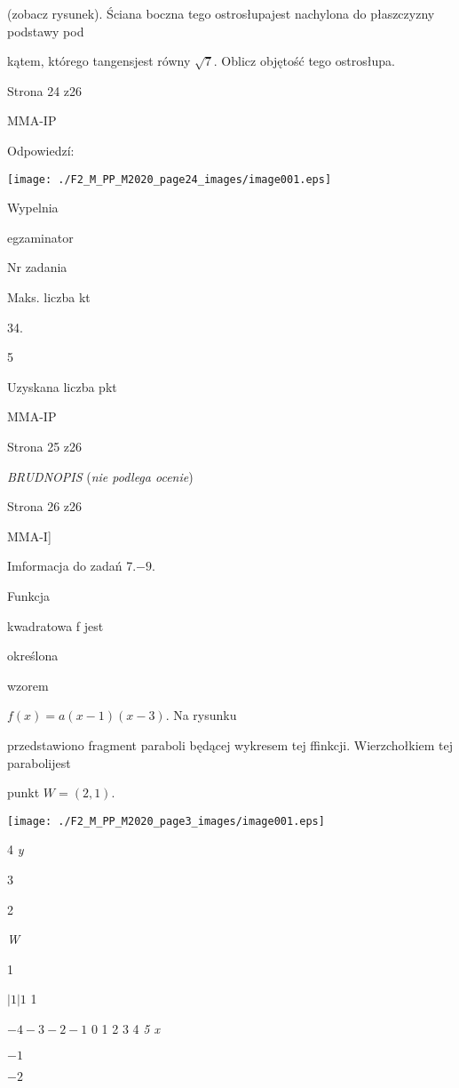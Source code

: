 \documentclass[a4paper,12pt]{article}
\begin{document}
(zobacz rysunek). Ściana boczna tego ostrosłupajest nachylona do płaszczyzny podstawy pod

kątem, którego tangensjest równy $\sqrt{7}$. Oblicz objętość tego ostrosłupa.

Strona 24 z26

MMA-IP





Odpowiedzí:
\begin{center}
\texttt{[image: ./F2\_M\_PP\_M2020\_page24\_images/image001.eps]}
\end{center}
Wypelnia

egzaminator

Nr zadania

Maks. liczba kt

34.

5

Uzyskana liczba pkt

MMA-IP

Strona 25 z26





{\it BRUDNOPIS} ({\it nie podlega ocenie})

Strona 26 z26

MMA-I]





Imformacja do zadań 7.$-9.$

Funkcja

kwadratowa f jest

określona

wzorem

$f(x)=a(x-1)(x-3)$. Na rysunku

przedstawiono fragment paraboli będącej wykresem tej ffinkcji. Wierzchołkiem tej parabolijest

punkt $W=(2,1).$
\begin{center}
\texttt{[image: ./F2\_M\_PP\_M2020\_page3\_images/image001.eps]}
\end{center}
4  {\it y}

3

2

{\it W}

1

$| 1  | 1$  1

$-4 -3  -2 -1$  0  1 2 3 4  {\it 5 x}

$-1$

$-2$
\end{document}
